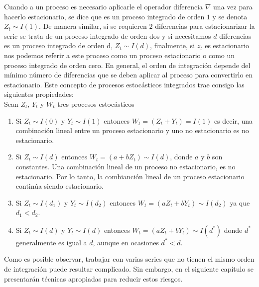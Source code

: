 Cuando a un proceso es necesario aplicarle el operador diferencia $\nabla$  una vez para hacerlo estacionario, se dice que es un proceso integrado de orden $1$ y se denota $Z_t \sim I(1)$. De manera similar, si se requieren $2$ diferencias para estacionarizar la serie se trata de un proceso integrado de orden dos y si necesitamos $d$ diferencias es un proceso integrado de orden d,  $Z_t \sim I(d)$, finalmente, si $z_t$ es estacionario nos podemos referir a este proceso como un proceso estacionario o como un proceso integrado de orden cero. En general, el orden de integración depende del mínimo número de diferencias que se deben aplicar al proceso para convertirlo en estacionario. Este concepto de procesos estocásticos integrados trae consigo las siguientes propiedades:\\

Sean $Z_t$, $Y_t$ y $W_t$ tres procesos estocásticos

\begin{enumerate}%

\item
 Si $Z_t \sim I(0)$ y  $Y_t \sim I(1)$ entonces $W_t=(Z_t+Y_t) = I(1)$ es decir, una combinación lineal entre un proceso estacionario y uno no estacionario es no estacionario.

\item
Si $Z_t \sim I(d)$ entonces $W_t=(a+bZ_t) \sim I(d)$, donde $a$ y $b$ son constantes. Una combinación lineal de un proceso no estacionario, es no estacionario. Por lo tanto, la combianción lineal de un proceso estacionario continúa siendo estacionario.

\item 
Si $Z_t \sim I(d_1)$ y $Y_t \sim I(d_2)$ entonces $W_t=(aZ_t+bY_t) \sim I(d_2)$ ya que $d_1<d_2$.

\item
Si $Z_t \sim I(d)$  y $Y_t \sim I(d)$ entonces $W_t=(aZ_t+bY_t) \sim I(d^*)$ donde $d^*$ generalmente es igual a $d$, aunque en ocasiones $d^* < d$. 

\end{enumerate}

Como es posible observar, trabajar con varias series que no tienen el mismo orden de integración puede resultar complicado. Sin embargo, en el siguiente capítulo se presentarán técnicas apropiadas para reducir estos riesgos. 



